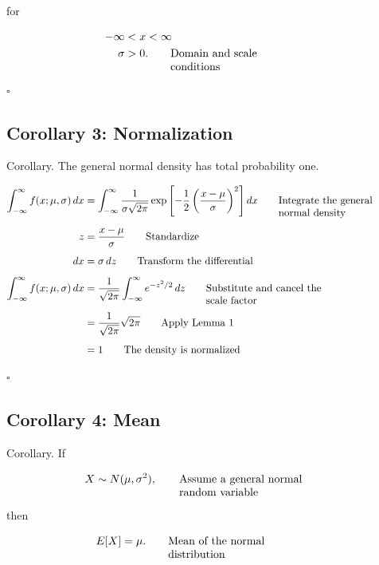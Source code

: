 \documentclass{article}
\newcommand{\justwidth}{0.36\textwidth}
\newcommand{\just}[1]{\parbox[t]{\justwidth}{\raggedright #1}}
\begin{document}
for

\begin{align*}
-\infty
&<
x
<
\infty
\\
\sigma
&>
0.
\tag*{\just{Domain and scale conditions}}
\end{align*}

$\square$

\subsection{Corollary 3: Normalization}
Corollary. The general normal density has total probability one.

\begin{align*}
\int_{-\infty}^{\infty}
f(x;\mu,\sigma)\,dx
&=
\int_{-\infty}^{\infty}
\frac{1}{\sigma\sqrt{2\pi}}
\exp\left[
-\frac{1}{2}
\left(
\frac{x-\mu}{\sigma}
\right)^2
\right]
dx
\tag*{\just{Integrate the general normal density}}
\\[0.45em]
z
&=
\frac{x-\mu}{\sigma}
\tag*{\just{Standardize}}
\\[0.45em]
dx
&=
\sigma\,dz
\tag*{\just{Transform the differential}}
\\[0.45em]
\int_{-\infty}^{\infty}
f(x;\mu,\sigma)\,dx
&=
\frac{1}{\sqrt{2\pi}}
\int_{-\infty}^{\infty}
e^{-z^2/2}\,dz
\tag*{\just{Substitute and cancel the scale factor}}
\\[0.45em]
&=
\frac{1}{\sqrt{2\pi}}
\sqrt{2\pi}
\tag*{\just{Apply Lemma 1}}
\\[0.45em]
&=
1
\tag*{\just{The density is normalized}}
\end{align*}

$\square$

\subsection{Corollary 4: Mean}
Corollary. If

\begin{align*}
X
&\sim
N(\mu,\sigma^2),
\tag*{\just{Assume a general normal random variable}}
\end{align*}

then

\begin{align*}
E[X]
&=
\mu.
\tag*{\just{Mean of the normal distribution}}
\end{align*}
\end{document}
